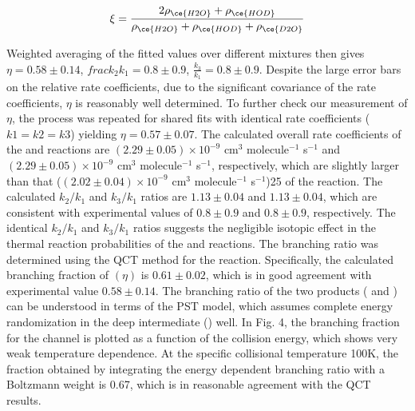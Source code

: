 \begin{equation}
	\xi = \frac{2 \rho_{\ce{H2O}} + \rho_{\ce{HOD}}}{\rho_{\ce{H2O}} + \rho_{\ce{HOD}} + \rho_{\ce{D2O}}}
\end{equation}

Weighted averaging of the fitted values over different mixtures then gives $\eta = 0.58 \pm 0.14$, $frac{k_2}{k_1} = 0.8 \pm 0.9$, $\frac{k_3}{k_1} = 0.8 \pm 0.9$. Despite the large error bars on the relative rate coefficients, due to the significant covariance of the rate coefficients, $\eta$ is reasonably well determined. To further check our measurement of $\eta$, the process was repeated for shared fits with identical rate coefficients ($k1 = k2 = k3$) yielding $\eta = 0.57 \pm 0.07$. The calculated overall rate coefficients of the  and  reactions are $(2.29 \pm 0.05) \times 10^{-9}$ cm$^3$ molecule$^{-1}$ s$^{-1}$ and $(2.29 \pm 0.05) \times 10^{-9}$ cm$^3$ molecule$^{-1}$ s$^{-1}$, respectively, which are slightly larger than that ($(2.02 \pm 0.04) \times 10^{-9}$ cm$^3$ molecule$^{-1}$ s$^{-1}$)25 of the  reaction. The calculated $k_2/k_1$ and $k_3/k_1$ ratios are $1.13 \pm 0.04$ and $1.13 \pm 0.04$, which are consistent with experimental values of $0.8 \pm 0.9$ and $0.8 \pm 0.9$, respectively. The identical $k_2/k_1$ and $k_3/k_1$ ratios suggests the negligible isotopic effect in the thermal reaction probabilities of the  and  reactions. The branching ratio was determined using the QCT method for the  reaction. Specifically, the calculated branching fraction of  $(\eta)$ is $0.61 \pm 0.02$, which is in good agreement with experimental value $0.58 \pm 0.14$. The branching ratio of the two products ( and ) can be understood in terms of the PST model, which assumes complete energy randomization in the deep intermediate () well. In Fig. 4, the branching fraction for the  channel is plotted as a function of the collision energy, which shows very weak temperature dependence. At the specific collisional temperature 100K, the fraction obtained by integrating the energy dependent branching ratio with a Boltzmann weight is 0.67, which is in reasonable agreement with the QCT results.

